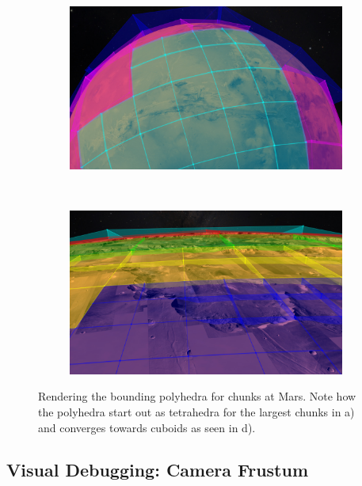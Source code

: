 \begin{figure}[h]
\begin{subfigure}[bt]{0.45\textwidth}
    \end{subfigure}
    \begin{subfigure}[bt]{0.45\textwidth}
        \includegraphics[width=\textwidth]{figures/results/screenshots_thesis_old/bounds3.jpg}
        \caption{}
    \end{subfigure}
    ~
    \begin{subfigure}[bt]{0.45\textwidth}
        \includegraphics[width=\textwidth]{figures/results/screenshots_thesis_old/bounds4.jpg}
        \caption{}
    \end{subfigure}
    \caption{Rendering the bounding polyhedra for chunks at Mars. Note how the polyhedra start out as tetrahedra for the largest chunks in a) and converges towards cuboids as seen in d). }
    \label{fig:boundingvolume}
\end{figure}

\clearpage
\subsection{Visual Debugging: Camera Frustum}
\FloatBarrier

